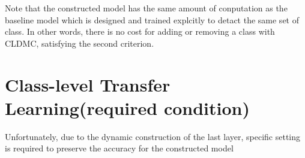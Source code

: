 \documentclass{article}
\begin{document}
Note that the constructed model has the same amount of conputation as the baseline model which is designed and trained explcitly to detact the same set of class. In other words, there is no cost for adding or removing a class with CLDMC, satisfying the second criterion.

\section{Class-level Transfer Learning(required condition)}

Unfortunately, due to the dynamic construction of the last layer, specific setting is required to preserve the accuracy for the constructed model

\begin{table*}[t]
    \centering
    \small
    \caption{Accuracy with different loss function}
    \label{table:accuracy}
\end{table*}
\end{document}
